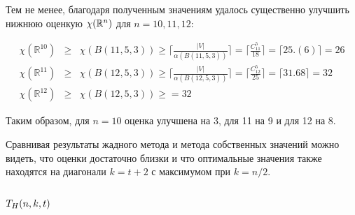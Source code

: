 Тем не менее, благодаря полученным значениям удалось существенно улучшить
нижнюю оценкую $\chi(\mathbb R^n)$ для $n=10,11,12$:
\begin{theorem}
    \begin{eqnarray}
        \chi(\mathbb R^{10}) &\geq& \chi(B(11,5,3)) \geq
            \lceil \frac{|V|}{\alpha(B(11,5,3))} \rceil =
            \lceil \frac{C_{11}^5}{18} \rceil = \lceil25.(6)\rceil = 26 \\
        \chi(\mathbb R^{11}) &\geq& \chi(B(12,5,3)) \geq
            \lceil \frac{|V|}{\alpha(B(12,5,3))} \rceil =
            \lceil \frac{C_{12}^5}{25} \rceil = \lceil31.68\rceil = 32 \\
        \chi(\mathbb R^{12}) &\geq& \chi(B(12,5,3)) \geq = 32
    \end{eqnarray}
\end{theorem}
Таким образом, для $n=10$ оценка улучшена на 3, для 11 на 9 и для 12 на 8.


Сравнивая результаты жадного метода и метода собственных значений можно
видеть, что оценки достаточно близки и что оптимальные значения также находятся
на диагонали $k=t+2$ с максимумом при $k=n/2$.

\subsection{$T_H(n,k,t)$}

